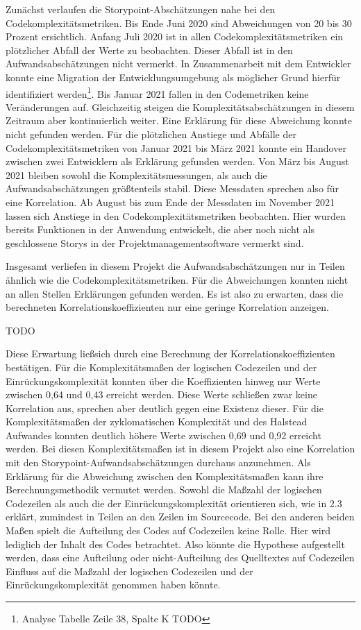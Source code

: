 Zunächst verlaufen die Storypoint-Abschätzungen nahe bei den
Codekomplexitätsmetriken. Bis Ende Juni 2020 sind Abweichungen von 20
bis 30 Prozent ersichtlich. Anfang Juli 2020 ist in allen
Codekomplexitätsmetriken ein plötzlicher Abfall der Werte zu beobachten.
Dieser Abfall ist in den Aufwandsabschätzungen nicht vermerkt. In
Zusammenarbeit mit dem Entwickler konnte eine Migration der
Entwicklungsumgebung als möglicher Grund hierfür identifiziert
werden\footnote{Analyse Tabelle Zeile 38, Spalte K TODO}. Bis Januar 2021
fallen in den Codemetriken keine Veränderungen auf. Gleichzeitig steigen
die Komplexitätsabschätzungen in diesem Zeitraum aber kontinuierlich
weiter. Eine Erklärung für diese Abweichung konnte nicht gefunden
werden. Für die plötzlichen Anstiege und Abfälle der
Codekomplexitätsmetriken von Januar 2021 bis März 2021 konnte ein
Handover zwischen zwei Entwicklern als Erklärung gefunden werden. Von
März bis August 2021 bleiben sowohl die Komplexitätsmessungen, als auch
die Aufwandsabschätzungen grö\ss tenteils stabil. Diese Messdaten sprechen
also für eine Korrelation. Ab August bis zum Ende der Messdaten im
November 2021 lassen sich Anstiege in den Codekomplexitätsmetriken
beobachten. Hier wurden bereits Funktionen in der Anwendung entwickelt,
die aber noch nicht als geschlossene Storys in der
Projektmanagementsoftware vermerkt sind.

Insgesamt verliefen in diesem Projekt die Aufwandsabschätzungen nur in
Teilen ähnlich wie die Codekomplexitätsmetriken. Für die Abweichungen
konnten nicht an allen Stellen Erklärungen gefunden werden. Es ist also
zu erwarten, dass die berechneten Korrelationskoeffizienten nur eine
geringe Korrelation anzeigen.

TODO

Diese Erwartung lie\ss  sich durch eine Berechnung der
Korrelationskoeffizienten bestätigen. Für die Komplexitätsma\ss en der
logischen Codezeilen und der Einrückungskomplexität konnten über die
Koeffizienten hinweg nur Werte zwischen 0,64 und 0,43 erreicht werden.
Diese Werte schlie\ss en zwar keine Korrelation aus, sprechen aber deutlich
gegen eine Existenz dieser. Für die Komplexitätsma\ss en der zyklomatischen
Komplexität und des Halstead Aufwandes konnten deutlich höhere Werte
zwischen 0,69 und 0,92 erreicht werden. Bei diesen Komplexitätsma\ss en ist
in diesem Projekt also eine Korrelation mit den
Storypoint-Aufwandsabschätzungen durchaus anzunehmen. Als Erklärung für
die Abweichung zwischen den Komplexitätsma\ss en kann ihre
Berechnungsmethodik vermutet werden. Sowohl die Ma\ss zahl der logischen
Codezeilen als auch die der Einrückungskomplexität orientieren sich, wie
in 2.3 erklärt, zumindest in Teilen an den Zeilen im Sourcecode. Bei den
anderen beiden Ma\ss en spielt die Aufteilung des Codes auf Codezeilen
keine Rolle. Hier wird lediglich der Inhalt des Codes betrachtet. Also
könnte die Hypothese aufgestellt werden, dass eine Aufteilung oder
nicht-Aufteilung des Quelltextes auf Codezeilen Einfluss auf die Ma\ss zahl
der logischen Codezeilen und der Einrückungskomplexität genommen haben
könnte.


